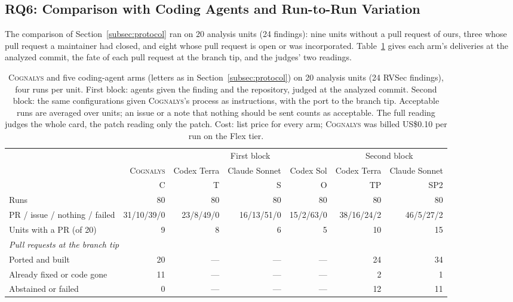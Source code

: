 \documentclass[conference]{IEEEtran}
\newcommand{\system}{\textsc{Cognalys}}
\newcommand{\researchq}[1]{\textbf{RQ#1}}
\begin{document}
\subsection{\researchq{6}: Comparison with Coding Agents and Run-to-Run Variation}
\label{subsec:rq6}

The comparison of Section~\ref{subsec:protocol} ran on 20 analysis units (24 findings): nine
units without a pull request of ours, three whose pull request a maintainer
had closed, and eight whose pull request is open or was incorporated.
Table~\ref{tab:optiona} gives each arm's deliveries at the analyzed commit, the
fate of each pull request at the branch tip, and the judges' two readings.

\begin{table}[t]
\centering
\caption{\system{} and five coding-agent arms (letters as in
Section~\ref{subsec:protocol}) on 20 analysis units (24 RVSec findings), four runs per unit. First
block: agents given the finding and the repository, judged at the analyzed
commit. Second block: the same configurations given \system{}'s process as
instructions, with the port to the branch tip. Acceptable runs are averaged
over units; an issue or a note that nothing should be sent counts as
acceptable. The full reading judges the whole card, the patch reading only the
patch. Cost: list price for every arm; \system{} was billed US\$0.10 per run on
the Flex tier.}
\label{tab:optiona}
\footnotesize
\setlength{\tabcolsep}{4pt}
\begin{tabular}{p{4.2cm}r|rrr|rr}
\toprule
 & & \multicolumn{3}{c|}{First block} & \multicolumn{2}{c}{Second block} \\
 & \system{} & Codex Terra & Claude Sonnet & Codex Sol & Codex Terra & Claude Sonnet \\
 & C & T & S & O & TP & SP2 \\
\midrule
Runs & 80 & 80 & 80 & 80 & 80 & 80 \\
PR / issue / nothing / failed & 31/10/39/0 & 23/8/49/0 & 16/13/51/0 & 15/2/63/0 & 38/16/24/2 & 46/5/27/2 \\
Units with a PR (of 20) & 9 & 8 & 6 & 5 & 10 & 15 \\
\multicolumn{7}{l}{\emph{Pull requests at the branch tip}} \\
\quad Ported and built & 20 & --- & --- & --- & 24 & 34 \\
\quad Already fixed or code gone & 11 & --- & --- & --- & 2 & 1 \\
\quad Abstained or failed & 0 & --- & --- & --- & 12 & 11 \\

\end{tabular}
\end{table}
\end{document}
